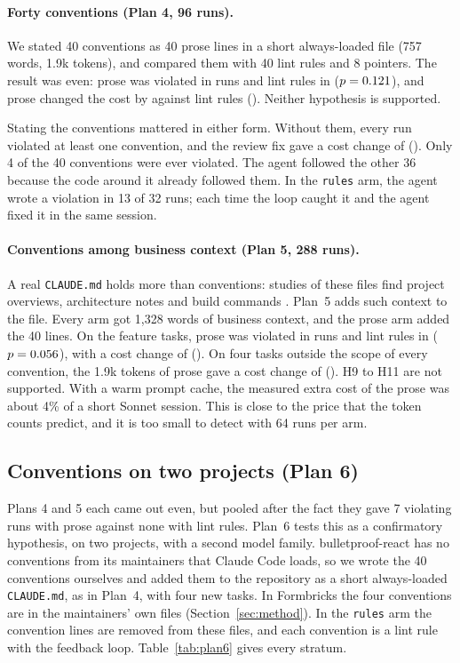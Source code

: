 \documentclass[pdflatex,sn-basic]{sn-jnl}
\newcommand{\file}[1]{\texttt{#1}}
\newcommand{\arm}[1]{\texttt{#1}}
\begin{document}
\paragraph{Forty conventions (Plan 4, 96 runs).}
We stated 40 conventions as 40 prose lines in a short always-loaded file (757 words, 1.9k tokens), and compared them with 40 lint rules and 8 pointers.
The result was even: prose was violated in \HSevenBreaks{} runs and lint rules in \HSevenBreaksAgainst{} ($p=0.121$), and prose changed the cost by \HEightCost{} against lint rules (\HEightCI).
Neither hypothesis is supported.

Stating the conventions mattered in either form.
Without them, every run violated at least one convention, and the review fix gave a cost change of \NoneVsProseCost{} (\NoneVsProseCI).
Only 4 of the 40 conventions were ever violated.
The agent followed the other 36 because the code around it already followed them.
In the \arm{rules} arm, the agent wrote a violation in 13 of 32 runs; each time the loop caught it and the agent fixed it in the same session.

\paragraph{Conventions among business context (Plan 5, 288 runs).}
A real \file{CLAUDE.md} holds more than conventions: studies of these files find project overviews, architecture notes and build commands \citep{chatlatanagulchai2025manifests,chatlatanagulchai2025agentreadmes}.
Plan~5 adds such context to the file.
Every arm got 1,328 words of business context, and the prose arm added the 40 lines.
On the feature tasks, prose was violated in \HNineBreaks{} runs and lint rules in \HNineBreaksAgainst{} ($p=0.056$), with a cost change of \HTenCost{} (\HTenCI).
On four tasks outside the scope of every convention, the 1.9k tokens of prose gave a cost change of \HElevenCost{} (\HElevenCI).
H9 to H11 are not supported.
With a warm prompt cache, the measured extra cost of the prose was about 4\% of a short Sonnet session.
This is close to the price that the token counts predict, and it is too small to detect with 64 runs per arm.

\subsection{Conventions on two projects (Plan 6)}
\label{sec:plan6}

Plans 4 and 5 each came out even, but pooled after the fact they gave 7 violating runs with prose against none with lint rules.
Plan~6 tests this as a confirmatory hypothesis, on two projects, with a second model family.
bulletproof-react has no conventions from its maintainers that Claude Code loads, so we wrote the 40 conventions ourselves and added them to the repository as a short always-loaded \file{CLAUDE.md}, as in Plan~4, with four new tasks.
In Formbricks the four conventions are in the maintainers' own files (Section~\ref{sec:method}).
In the \arm{rules} arm the convention lines are removed from these files, and each convention is a lint rule with the feedback loop.
Table~\ref{tab:plan6} gives every stratum.
\end{document}
